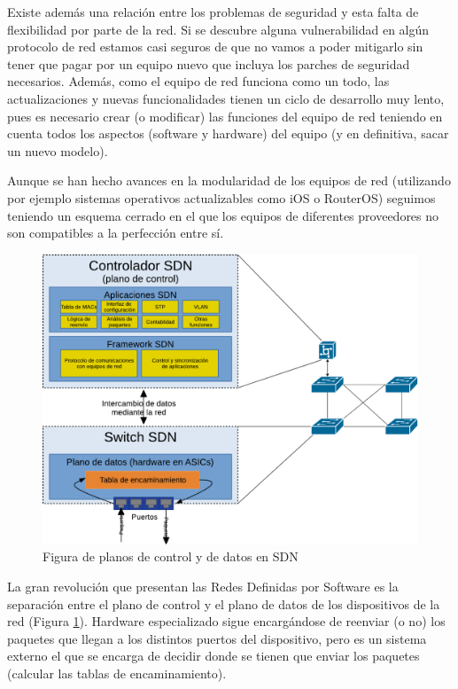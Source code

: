 Existe además una relación entre los problemas de seguridad y esta falta de flexibilidad por parte de la red. Si se descubre alguna vulnerabilidad en algún protocolo de red estamos casi seguros de que no vamos a poder mitigarlo sin tener que pagar por un equipo nuevo que incluya los parches de seguridad necesarios. Además, como el equipo de red funciona como un todo, las actualizaciones y nuevas funcionalidades tienen un ciclo de desarrollo muy lento, pues es necesario crear (o modificar) las funciones del equipo de red teniendo en cuenta todos los aspectos (software y hardware) del equipo (y en definitiva, sacar un nuevo modelo). 

Aunque se han hecho avances en la modularidad de los equipos de red (utilizando por ejemplo sistemas operativos actualizables como iOS o RouterOS) seguimos teniendo un esquema cerrado en el que los equipos de diferentes proveedores no son compatibles a la perfección entre sí.


\begin{figure}[h!]
    \centering
    \includegraphics[width=\textwidth]{imagenes/figuras/Switch sdn.pdf}
    \caption{Figura de planos de control y de datos en SDN}
    \label{fig:planos_red_sdn}
\end{figure}

La gran revolución que presentan las Redes Definidas por Software es la separación entre el plano de control y el plano de datos de los dispositivos de la red (Figura \ref{fig:planos_red_sdn}). Hardware especializado sigue encargándose de reenviar (o no) los paquetes que llegan a los distintos puertos del dispositivo, pero es un sistema externo el que se encarga de decidir donde se tienen que enviar los paquetes (calcular las tablas de encaminamiento).

